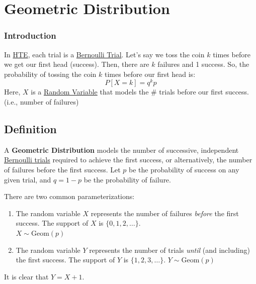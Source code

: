 \chapter{Geometric Distribution}
\label{chap:geometric-distribution}

\subsection{Introduction}
\label{ssec:introduction-geometric-distribution}

\begin{eg}
  In \href{sec:head-tail-experiment}{HTE}, each trial is a
  \href{def:bernoulli-process}{Bernoulli Trial}.
  Let's say we toss the coin \(k\) times before we get our first head (success).
  Then, there are \(k\) failures and 1 success.
  So, the probability of tossing the coin \(k\) times before our first head is:
  \[ P[X=k] = q^{k}p\]
  Here, \(X\) is a \href{def:random-variable}{Random Variable} that models the
  \(\#\) trials before our first success. (i.e., number of failures)
\end{eg}

\section{Definition}
\label{sec:definition-geometric-distribution}

\begin{definition}
  A \textbf{Geometric Distribution} models the number of successive, independent \href{def:bernoulli-process}{Bernoulli trials} required to achieve the first success, or alternatively, the number of failures before the first success. Let \(p\) be the probability of success on any given trial, and \(q = 1-p\) be the probability of failure.

  There are two common parameterizations:
  \begin{enumerate}
    \item The random variable \(X\) represents the number of failures
      \textit{before} the first success. The support of \(X\) is \(\{0, 1, 2,
      \dots\}\).\\
      \textbf{\(X\sim \text{Geom}(p)\) }
    \item The random variable \(Y\) represents the number of trials \textit{until} (and including) the first success. The support of \(Y\) is \(\{1, 2, 3, \dots\}\).
      \textbf{\(Y\sim \text{Geom}(p)\) }
  \end{enumerate}
  It is clear that \(Y = X+1\).

\end{definition}

